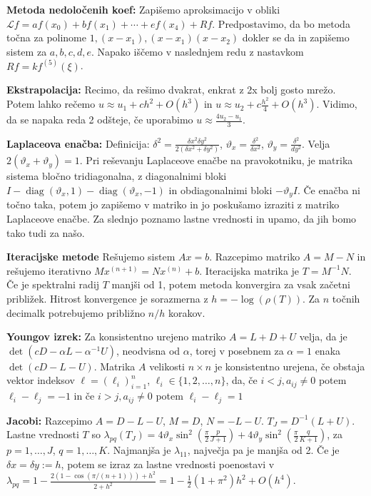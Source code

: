 \documentclass[a4paper,12pt]{article}
\theoremstyle{definition}
\renewcommand{\theta}{\vartheta}
\renewcommand{\L}{\mathcal{L}}
\newcommand{\dx}{\delta x}
\newcommand{\dy}{\delta y}
\newcommand{\diag}{\operatorname{diag}}
\begin{document}
\textbf{Metoda nedoločenih koef:}
Zapišemo aproksimacijo v obliki $\L f = af(x_0) + bf(x_1) + \cdots + ef(x_4) + Rf$. Predpostavimo, da bo metoda točna za polinome $1, (x-x_1), (x-x_1)(x-x_2)$ dokler se da in
zapišemo sistem za $a, b, c, d, e$. Napako iščemo v naslednjem redu z nastavkom $Rf = k f^{(5)}(\xi)$.

\textbf{Ekstrapolacija:}
Recimo, da rešimo dvakrat, enkrat z 2x bolj gosto mrežo. Potem lahko rečemo $u \approx u_1 + ch^2 + O(h^3)$ in $u \approx u_2 + c \frac{h^2}{4} + O(h^3)$.
Vidimo, da se napaka reda 2 odšteje, če uporabimo $u \approx \frac{4u_2 - u_1}{3}$.

\textbf{Laplaceova enačba:}
Definicija: $\delta^2 = \frac{\dx^2\dy^2}{2(\dx^2+\dy^2)}$, $\theta_x = \frac{\delta^2}{\dx^2}$, $\theta_y = \frac{\delta^2}{dy^2}$. Velja $2(\theta_x + \theta_y) = 1$.
Pri reševanju Laplaceove enačbe na pravokotniku, je matrika sistema bločno tridiagonalna, z diagonalnimi bloki
$I - \diag(\theta_x, 1) - \diag(\theta_x, -1)$ in
obdiagonalnimi bloki $-\theta_y I$.
Če enačba ni točno taka, potem jo zapišemo v matriko in jo poskušamo
izraziti z matriko Laplaceove enačbe. Za slednjo poznamo lastne vrednosti
in upamo, da jih bomo tako tudi za našo.

\textbf{Iteracijske metode}
Rešujemo sistem $Ax =b$. Razcepimo matriko $A = M-N$ in rešujemo iterativno
$Mx^{(n+1)} = Nx^{(n)} + b$. Iteracijska matrika je $T = M^{-1}N$.
Če je spektralni radij $T$ manjši od 1, potem metoda konvergira za vsak začetni približek. Hitrost konvergence je sorazmerna z $h = -\log(\rho(T))$. Za $n$ točnih decimalk potrebujemo približno $n / h$ korakov.

\textbf{Youngov izrek:} Za konsistentno urejeno matriko $A = L + D + U$ velja,
da je $\det(cD - \alpha L - \alpha^{-1}U)$, neodvisna od $\alpha$, torej v
posebnem za $\alpha = 1$ enaka $\det(cD - L - U)$. Matrika $A$ velikosti $n\times n$
je konsistentno urejena, če obstaja vektor indeksov $\ell = (\ell_i)_{i=1}^n$,
$\ell_i \in \{1, 2, \ldots, n\}$, da, če $i < j, a_{ij} \neq 0$ potem $\ell_i - \ell_j = -1$ in če $i > j, a_{ij} \neq 0$ potem $\ell_i - \ell_j = 1$

\textbf{Jacobi:}
Razcepimo $A = D - L - U$, $M = D$, $N = -L-U$. $T_J = D^{-1}(L+U)$.
Lastne vrednosti $T$ so
$\lambda_{pq}(T_J) = 4\theta_x \sin^2\left(\frac{\pi}{2} \frac{p}{J+1}\right) +
4\theta_y \sin^2\left(\frac{\pi}{2} \frac{q}{K+1}\right)$, za $p = 1, \ldots, J$, $q = 1, \ldots, K$. Najmanjša je $\lambda_{11}$, največja pa je manjša od 2.
Če je $\dx = \dy := h$, potem se izraz za lastne vrednosti poenostavi v
$\lambda_{pq} = 1 - \frac{2(1-\cos(\pi / (n+1))) + h^2}{2+h^2} =
1 - \frac12 (1+\pi^2)h^2 + O(h^4)$.
\end{document}
